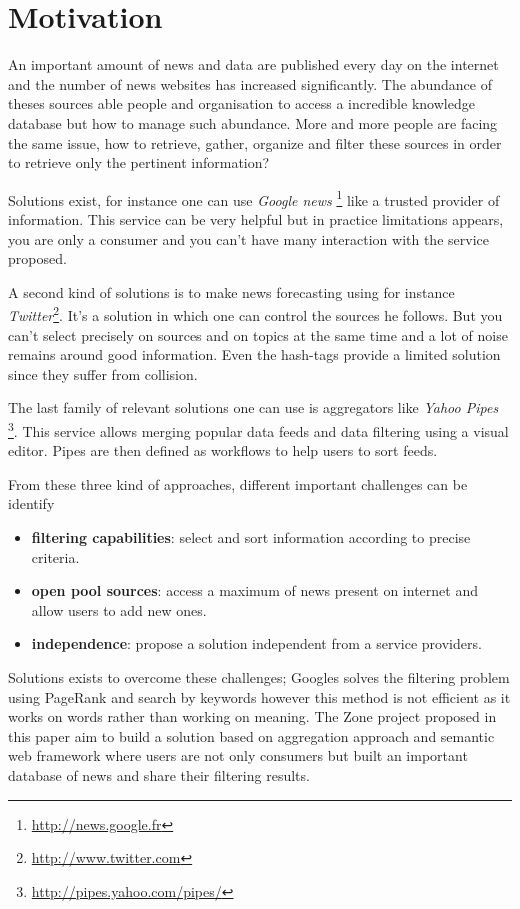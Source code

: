 \documentclass{llncs}
\begin{document}
\section{Motivation}
%
An important amount of news and data are published every day on the internet and the number of news websites has increased significantly. The abundance of theses sources able people and organisation to access a incredible knowledge database but how to manage such abundance. More and more people are facing the same issue, how to retrieve, gather, organize and filter these sources in order to retrieve only the pertinent information?

Solutions exist, for instance one can use \textsl{Google news} \footnote{\url{http://news.google.fr}} like a trusted provider of information. This service can be very helpful but in practice limitations appears, you are only a consumer and you can't have many interaction with the service proposed.

A second kind of solutions is to make news forecasting using for instance \textsl{Twitter}\footnote{\url{http://www.twitter.com}}. It's a solution in which one can control the sources he follows. But you can't select precisely on sources and on topics at the same time and a lot of noise remains around good information. Even the hash-tags provide a limited solution since they suffer from collision.  

The last family of relevant solutions one can use is aggregators like \textsl{Yahoo Pipes} \footnote{\url{http://pipes.yahoo.com/pipes/}}. This service allows merging popular data feeds and data filtering using a visual editor. Pipes are then defined as workflows to help users to sort feeds.

From these three kind of approaches, different important challenges can be identify
\begin{itemize}
  \item \textbf{filtering capabilities}: select and sort information according to precise criteria.
  \item \textbf{open pool sources}: access a maximum of news present on internet and allow users to add new ones.
  \item \textbf{independence}: propose a solution independent from a service providers.
\end{itemize}

Solutions exists to overcome these challenges; Googles solves the filtering problem using PageRank and search by keywords \cite{page:brin} however this method is not efficient as it works on words rather than working on meaning. The Zone project proposed in this paper aim to build a solution based on aggregation approach and semantic web framework where users are not only consumers but built an important database of news and share their filtering results.
\end{document}
